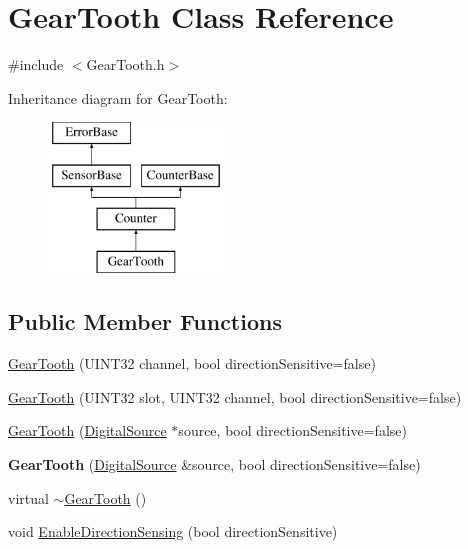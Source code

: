 \hypertarget{classGearTooth}{\section{\-Gear\-Tooth \-Class \-Reference}
\label{classGearTooth}
}


{\ttfamily \#include $<$\-Gear\-Tooth.\-h$>$}

\-Inheritance diagram for \-Gear\-Tooth\-:\begin{figure}[H]
\begin{center}
\leavevmode
\includegraphics[height=4.000000cm]{classGearTooth}
\end{center}
\end{figure}
\subsection*{\-Public \-Member \-Functions}
\begin{DoxyCompactItemize}
\item 
\hyperlink{classGearTooth_ad11e01b0445488157a029faebe06b0a8}{\-Gear\-Tooth} (\-U\-I\-N\-T32 channel, bool direction\-Sensitive=false)
\item 
\hyperlink{classGearTooth_ab6b5c091b0cdc9f032e6bc974c5bb5e5}{\-Gear\-Tooth} (\-U\-I\-N\-T32 slot, \-U\-I\-N\-T32 channel, bool direction\-Sensitive=false)
\item 
\hyperlink{classGearTooth_a6d69ae72386bb5bc2977b40a05964281}{\-Gear\-Tooth} (\hyperlink{classDigitalSource}{\-Digital\-Source} $\ast$source, bool direction\-Sensitive=false)
\item 
\hypertarget{classGearTooth_a1c077b7e532f113cfa9b27c796155564}{{\bfseries \-Gear\-Tooth} (\hyperlink{classDigitalSource}{\-Digital\-Source} \&source, bool direction\-Sensitive=false)}\label{classGearTooth_a1c077b7e532f113cfa9b27c796155564}

\item 
virtual \hyperlink{classGearTooth_a53619e7569c7d259b039420cbb9b712f}{$\sim$\-Gear\-Tooth} ()
\item 
void \hyperlink{classGearTooth_a0bec962d2920dc28f8d4ef53b5fa2c65}{\-Enable\-Direction\-Sensing} (bool direction\-Sensitive)
\end{DoxyCompactItemize}
